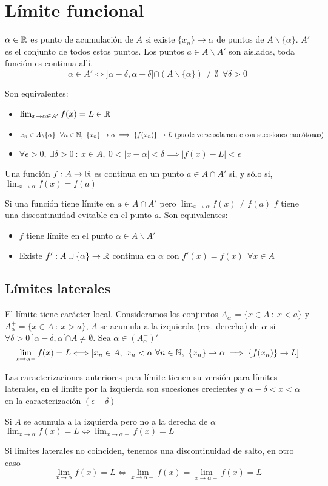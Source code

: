 \section{Límite funcional}
$\alpha\in\mathbb{R}$ es punto de acumulación de $A$ si existe  $\{x_n\}\rightarrow\alpha$ de puntos de $A\backslash\{\alpha \}$. 
$A'$ es el conjunto de todos estos puntos.
Los puntos $a\in A\backslash A'$ son aislados, toda función es continua allí.
$$ \alpha\in A' \Longleftrightarrow
]\alpha-\delta, \alpha +\delta[\cap(A\backslash\{\alpha\})\not =\emptyset \ \ \forall\delta>0 $$

Son equivalentes:
\begin{itemize}
	\item $\lim_{x\rightarrow\alpha\in A'} f(x) = L\in\mathbb{R}$
	\item $ x_n\in A\backslash\{\alpha\}\ \ \forall n\in\N, \ \{x_n\}\rightarrow\alpha \implies \{f(x_n)\}\rightarrow L \text{ (puede verse solamente con sucesiones monótonas)}$
	\item $ \forall\epsilon>0, \ \exists\delta>0 \ : \ x\in A, \ 0<|x-\alpha|<\delta \implies |f(x)-L|<\epsilon $
\end{itemize}

Una función $f:A\rightarrow\mathbb{R}$ es continua en un punto $a\in A\cap A'$ si, y sólo si, $\lim_{x\rightarrow\alpha} f(x) = f(a)$

Si una función tiene límite en $a\in A\cap A'$ pero $\lim_{x\rightarrow\alpha} f(x) \not=f(a)$ $f$ tiene una discontinuidad evitable en el punto $a$. Son equivalentes:
\begin{itemize}
	\item $f$ tiene límite en el punto $\alpha\in A\backslash A'$
	\item Existe $f':A\cup\{\alpha\} \rightarrow\mathbb{R}$ continua en $\alpha$ con $f'(x)=f(x) \ \ \forall x\in A$
\end{itemize}

\subsection{Límites laterales}
El límite tiene carácter local. 
Consideramos los conjuntos $A_{\alpha}^- = \{x\in A \ : \ x<a\}$ y $A_{\alpha}^+ = \{x\in A \ : \ x>a\}$, $A$ se acumula a la izquierda (res. derecha) de $\alpha$ si $\forall\delta>0 \ ]\alpha-\delta, \alpha[\cap A \not =\emptyset$.
Sea $\alpha\in (A_{\alpha}^-)'$
$$ \lim_{x\rightarrow\alpha -} f(x) = L \Longleftrightarrow
 [ x_n\in A, \ x_n<\alpha \ \forall n\in\mathbb{N}, \ \{x_n\}\rightarrow\alpha \implies \{f(x_n)\}\rightarrow L ] $$

Las caracterizaciones anteriores para límite tienen su versión para límites laterales, en el  límite por la izquierda son sucesiones crecientes y $\alpha-\delta<x<\alpha$ en la caracterización $(\epsilon-\delta)$

Si $A$ se acumula a la izquierda pero no a la derecha de $\alpha\ \ $ $ \lim_{x\rightarrow\alpha} f(x) = L \Longleftrightarrow
 \lim_{x\rightarrow \alpha-} f(x) = L $

Si límites laterales no coinciden, tenemos una discontinuidad de salto, en otro caso
$$ \lim_{x\rightarrow\alpha} f(x) = L \Longleftrightarrow
 \lim_{x\rightarrow\alpha-} f(x) = \lim_{x\rightarrow\alpha+} f(x) = L$$